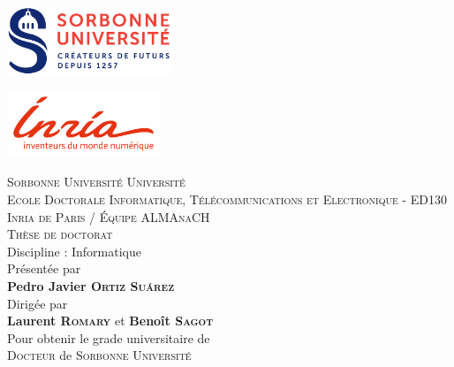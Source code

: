 
\begin{titlepage}

\begin{center}
	\begin{minipage}[t]{0.4\textwidth}
		\includegraphics[height=2cm]{static/media/sorbonne}
	\end{minipage}%
	\hfill
	\begin{minipage}[t]{0.4\textwidth}
		\hfill
		\includegraphics[height=2cm]{static/media/inria}
	\end{minipage}
	
	\vspace{0.2cm}
	\LARGE \textsc{Sorbonne Université Université}\\
	\vspace{0.2cm}
	\normalsize \textsc{Ecole Doctorale Informatique, Télécommunications et Electronique} - ED130\\
	\vspace{0.2cm}
	\textsc{Inria de Paris / Équipe ALMAnaCH}\\
    
	\vspace{0.4cm}
	\Large \textsc{Thèse de doctorat}\\
	\normalsize Discipline : Informatique\\
	\vspace{0.4cm}
	\normalsize Présentée par \\
	\LARGE \textbf{Pedro Javier \textsc{Ortiz Suárez}}\\
	\vspace{0.4cm}
	\normalsize Dirigée par \\
	\Large \textbf{Laurent \textsc{Romary}} et \textbf{Benoît \textsc{Sagot}}\\
	\vspace{0.4cm}
	\normalsize Pour obtenir le grade universitaire de\\
	\Large \textsc{Docteur} de \textsc{Sorbonne Université}
    

\end{center}
\end{titlepage}
